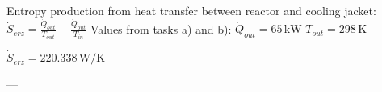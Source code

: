 Entropy production from heat transfer between reactor and cooling jacket:  
\( \dot{S}_{erz} = \frac{\dot{Q}_{out}}{T_{out}} - \frac{\dot{Q}_{out}}{T_{in}} \)  
Values from tasks a) and b):  
\( \dot{Q}_{out} = 65 \, \text{kW} \)  
\( T_{out} = 298 \, \text{K} \)  

\( \dot{S}_{erz} = 220.338 \, \text{W/K} \)  

---